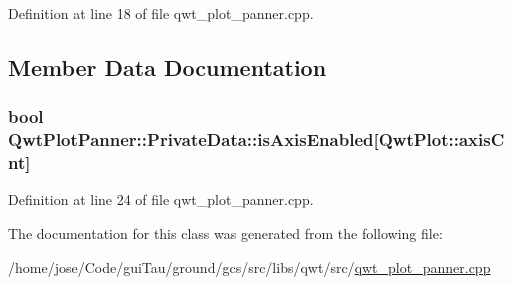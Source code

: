 Definition at line 18 of file qwt\-\_\-plot\-\_\-panner.\-cpp.



\subsection{Member Data Documentation}
\hypertarget{class_qwt_plot_panner_1_1_private_data_a6e21e6320bbb51e2ea1679aa05c3aa24}{
\subsubsection[{is\-Axis\-Enabled}]{\setlength{\rightskip}{0pt plus 5cm}bool Qwt\-Plot\-Panner\-::\-Private\-Data\-::is\-Axis\-Enabled\mbox{[}{\bf Qwt\-Plot\-::axis\-Cnt}\mbox{]}}}\label{class_qwt_plot_panner_1_1_private_data_a6e21e6320bbb51e2ea1679aa05c3aa24}


Definition at line 24 of file qwt\-\_\-plot\-\_\-panner.\-cpp.



The documentation for this class was generated from the following file\-:\begin{DoxyCompactItemize}
\item 
/home/jose/\-Code/gui\-Tau/ground/gcs/src/libs/qwt/src/\hyperlink{qwt__plot__panner_8cpp}{qwt\-\_\-plot\-\_\-panner.\-cpp}\end{DoxyCompactItemize}

